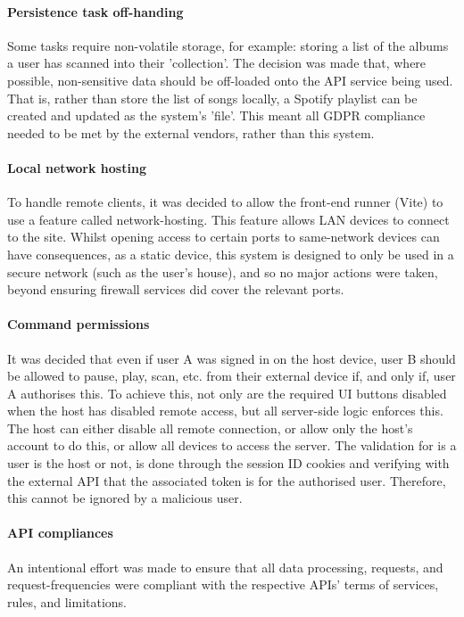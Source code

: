             \paragraph{Persistence task off-handing} Some tasks require non-volatile storage, for example: storing a list of the albums a user has scanned into their 'collection'. The decision was made that, where possible, non-sensitive data should be off-loaded onto the API service being used. That is, rather than store the list of songs locally, a Spotify playlist can be created and updated as the system's 'file'. This meant all GDPR compliance needed to be met by the external vendors, rather than this system.
    
            \paragraph{Local network hosting} To handle remote clients, it was decided to allow the front-end runner (Vite) to use a feature called network-hosting. This feature allows LAN devices to connect to the site. Whilst opening access to certain ports to same-network devices can have consequences, as a static device, this system is designed to only be used in a secure network (such as the user's house), and so no major actions were taken, beyond ensuring firewall services did cover the relevant ports.
    
            \paragraph{Command permissions} It was decided that even if user A was signed in on the host device, user B should be allowed to pause, play, scan, etc. from their external device if, and only if, user A authorises this. To achieve this, not only are the required UI buttons disabled when the host has disabled remote access, but all server-side logic enforces this. The host can either disable all remote connection, or allow only the host's account to do this, or allow all devices to access the server. The validation for is a user is the host or not, is done through the session ID cookies and verifying with the external API that the associated token is for the authorised user. Therefore, this cannot be ignored by a malicious user.
    
            \paragraph{API compliances} An intentional effort was made to ensure that all data processing, requests, and request-frequencies were compliant with the respective APIs' terms of services, rules, and limitations.
        
